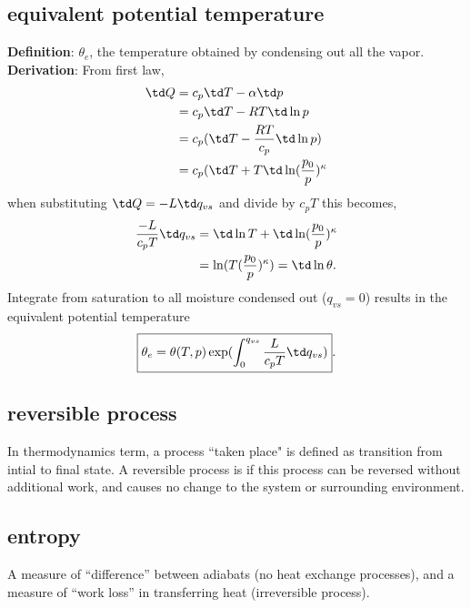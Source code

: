 \subsection{equivalent potential temperature}
{\bf{Definition}}: $\theta_e$, the temperature obtained by condensing out all the vapor. \\

{\bf{Derivation}}: From first law, 
\begin{equation}
\begin{aligned}
   \td Q & = c_p \td T - \alpha \td p \\ 
         & = c_p \td T - RT \td \ln p \\
         & = c_p( \td T - \frac{RT}{c_p} \td \ln p) \\
         & = c_p( \td T + T \td \ln(\frac{p_0}{p})^\kappa 
\end{aligned}
\end{equation}
when substituting $\td Q = -L\td q_{vs}$ and divide by $c_p T$ this becomes, 
\begin{equation}
\begin{aligned}
   \frac{-L}{c_pT} \td q_{vs} & = \td \ln T + \td \ln(\frac{p_0}{p})^\kappa \\
          & = \ln (T(\frac{p_0}{p})^\kappa) = \td \ln \theta.
\end{aligned}
\end{equation}
Integrate from saturation to all moisture condensed out ($q_{vs}=0$) results in the equivalent potential
temperature
\begin{equation}
\begin{aligned}
   \boxed{\theta_e = \theta(T,p) \exp(\int_0^{q_{vs}} \frac{L}{c_pT} \td q_{vs})}.
\end{aligned}
\end{equation}

\subsection{reversible process}
In thermodynamics term, a process ``taken place" is defined as transition from intial to final
state. A reversible process is if this process can be reversed without additional work, and causes
no change to the system or surrounding environment. 

\subsection{entropy}
A measure of ``difference'' between adiabats (no heat exchange processes), and a measure of ``work
loss'' in transferring heat (irreversible process). \\

